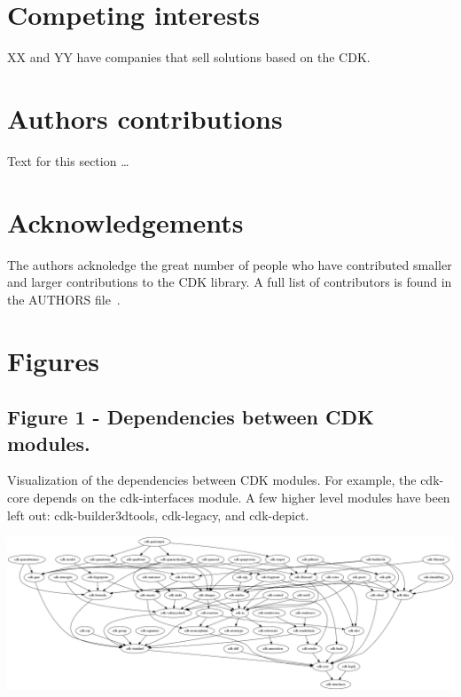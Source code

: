\documentclass[10pt]{bmcart}
\begin{document}
\begin{backmatter}

\section*{Competing interests}
XX and YY have companies that sell solutions based on the CDK.

\section*{Authors contributions}
    Text for this section \ldots


\section*{Acknowledgements}
The authors acknoledge the great number of people who have contributed smaller
and larger contributions to the CDK library. A full list of contributors is
found in the AUTHORS file~\cite{AUTHORS}.




\newpage


\section*{Figures}
  \subsection*{Figure 1 - Dependencies between CDK modules.}
  \label{fig:deps}
      Visualization of the dependencies between CDK modules. For example,
      the cdk-core depends on the cdk-interfaces module. A few higher level
      modules have been left out: cdk-builder3dtools, cdk-legacy, and
      cdk-depict.

\includegraphics[width=\textwidth]{cdkDeps.png}


\end{backmatter}
\end{document}
